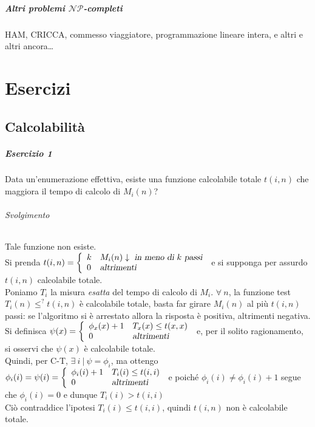 \documentclass[10pt]{book}
\begin{document}
\paragraph{Altri problemi $\mathscr{NP}$-completi} HAM, CRICCA, commesso viaggiatore, programmazione lineare intera, e altri e altri ancora\ldots
\chapter{Esercizi}
\section{Calcolabilità}
\paragraph{Esercizio 1} Data un'enumerazione effettiva, esiste una funzione calcolabile totale $t(i,n)$ che maggiora il tempo di calcolo di $M_i(n)$?
\subparagraph{Svolgimento} Tale funzione non esiste.\\
Si prenda $t(i,n) = \left\{\begin{array}{l l}
	k&M_i(n)\downarrow\textsl{ in meno di }k\textsl{ passi}\\
	0&\textsl{altrimenti}
\end{array}\right.$ e si supponga per assurdo $t(i,n)$ calcolabile totale.\\
Poniamo $T_i$ la misura \textit{esatta} del tempo di calcolo di $M_i$. $\forall\:n$, la funzione test $T_i(n)\leq^?t(i,n)$ è calcolabile totale, basta far girare $M_i(n)$ al più $t(i,n)$ passi: se l'algoritmo si è arrestato allora la risposta è positiva, altrimenti negativa.\\
Si definisca $\psi(x) = \left\{\begin{array}{l l}
\phi_x(x) + 1&T_x(x)\leq t(x,x)\\
0&\textsl{altrimenti}
\end{array}\right.$ e, per il solito ragionamento, si osservi che $\psi(x)$ è calcolabile totale.\\
Quindi, per C-T, $\exists\:i\:|\:\psi = \phi_i$, ma ottengo $\phi_i(i) = \psi(i) = \left\{\begin{array}{l l}
\phi_i(i) + 1&T_i(i)\leq t(i,i)\\
0&\textsl{altrimenti}
\end{array}\right.$ e poiché $\phi_i(i)\neq\phi_i(i)+1$ segue che $\phi_i(i) = 0$ e dunque $T_i(i) > t(i,i)$\\
Ciò contraddice l'ipotesi $T_i(i)\leq t(i,i)$, quindi $t(i,n)$ non è calcolabile totale.
\end{document}
